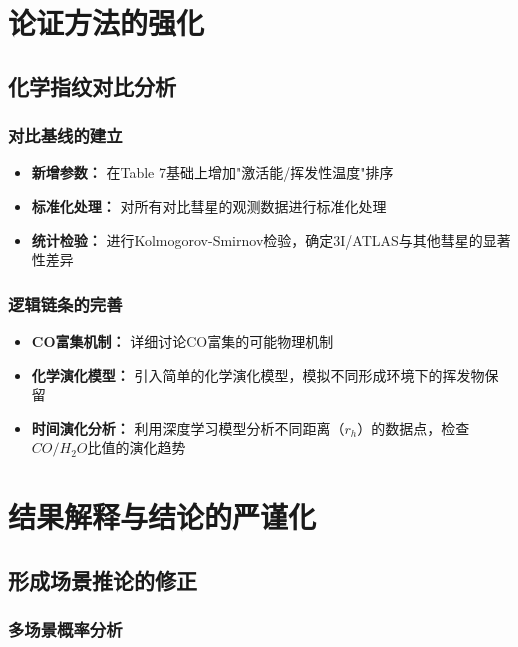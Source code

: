 \documentclass[12pt]{article}
\begin{document}
\section{论证方法的强化}

\subsection{化学指纹对比分析}

\subsubsection{对比基线的建立}

\begin{itemize}[leftmargin=*]
\item \textbf{新增参数：} 在Table 7基础上增加"激活能/挥发性温度"排序
\item \textbf{标准化处理：} 对所有对比彗星的观测数据进行标准化处理
\item \textbf{统计检验：} 进行Kolmogorov-Smirnov检验，确定3I/ATLAS与其他彗星的显著性差异
\end{itemize}

\subsubsection{逻辑链条的完善}

\begin{itemize}[leftmargin=*]
\item \textbf{CO富集机制：} 详细讨论CO富集的可能物理机制
\item \textbf{化学演化模型：} 引入简单的化学演化模型，模拟不同形成环境下的挥发物保留
\item \textbf{时间演化分析：} 利用深度学习模型分析不同距离（$r_h$）的数据点，检查$CO/H_2O$比值的演化趋势
\end{itemize}

\section{结果解释与结论的严谨化}

\subsection{形成场景推论的修正}

\subsubsection{多场景概率分析}
\end{document}
